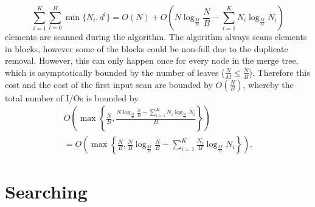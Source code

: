 \documentclass[a4paper,12pt]{article}
\begin{document}
\[
  \sum_{i=1}^K \sum_{l = 0}^H \min\{N_i, d^l\} = O(N) + O\left( N \log_{\frac{M}{B}}{\frac{N}{B}} - \sum_{i = 1}^K N_i \log_{\frac{M}{B}}{N_i} \right)
\]
elements are scanned during the algorithm. The algorithm always scans elements in blocks, however some of the blocks could be non-full due to the duplicate removal. However, this can only happen once for every node in the merge tree, which is asymptotically bounded by the number of leaves ($\frac{N}{M} \leq \frac{N}{B}$). Therefore this cost and the cost of the first input scan are bounded by $O(\frac{N}{B})$, whereby the total number of I/Os is bounded by
\begin{align*}
  O\left( \max\left\{ \frac{N}{B}, \frac{N \log_{\frac{M}{B}}{\frac{N}{B}} - \sum_{i = 1}^K N_i \log_{\frac{M}{B}}{N_i}}{B} \right\} \right) \\
    = O\left( \max\left\{ \frac{N}{B}, \frac{N}{B} \log_{\frac{M}{B}}{\frac{N}{B}} - \sum_{i=1}^K \frac{N_i}{B} \log_{\frac{M}{B}}{N_i} \right\} \right).
\end{align*}

\pagebreak
\section{Searching}
\end{document}
